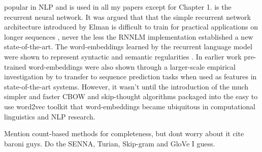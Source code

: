 popular in NLP and is used in all my papers except for Chapter 1. is the recurrent neural network. It was argued that that the simple recurrent network architecture introduced by Elman is difficult to train for practical applications on longer sequences \cite{bengio1994learning}, never the less the RNNLM implementation \cite{mikolov2010recurrent} established a new state-of-the-art. The word-embeddings learned by the recurrent language model were shown to represent syntactic and semantic regularities \cite{mikolov2013linguistic}.  In earlier work pre-trained word-embeddings were also shown through a larger-scale empirical investigation by \cite{turian2010word} to transfer to sequence prediction tasks when used as features in state-of-the-art systems. 
However, it wasn't until the introduction of the much simpler and faster CBOW and skip-thought algorithms packaged into the easy to use word2vec toolkit that word-embeddings became ubiquitous in computational linguistics and NLP research. 



Mention count-based methods for completeness, but dont worry about it cite baroni guys.
Do the SENNA, Turian, Skip-gram and GloVe I guess.

